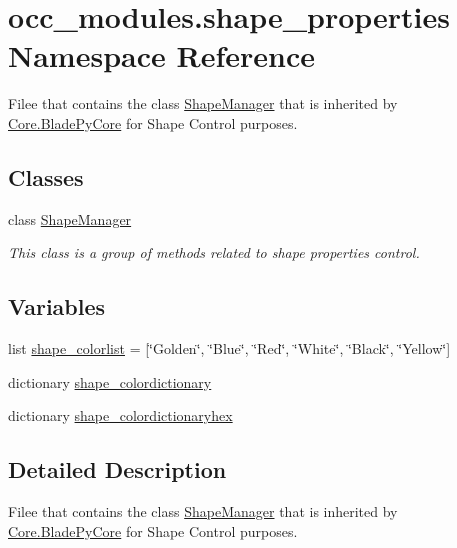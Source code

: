 \hypertarget{namespaceocc__modules_1_1shape__properties}{}\section{occ\+\_\+modules.\+shape\+\_\+properties Namespace Reference}
\label{namespaceocc__modules_1_1shape__properties}


Filee that contains the class \hyperlink{classocc__modules_1_1shape__properties_1_1_shape_manager}{Shape\+Manager} that is inherited by \hyperlink{class_core_1_1_blade_py_core}{Core.\+Blade\+Py\+Core} for Shape Control purposes.  


\subsection*{Classes}
\begin{DoxyCompactItemize}
\item 
class \hyperlink{classocc__modules_1_1shape__properties_1_1_shape_manager}{Shape\+Manager}
\begin{DoxyCompactList}\small\item\em This class is a group of methods related to shape properties control. \end{DoxyCompactList}\end{DoxyCompactItemize}
\subsection*{Variables}
\begin{DoxyCompactItemize}
\item 
list \hyperlink{namespaceocc__modules_1_1shape__properties_ad2dbba5d4e06c2ef16d74722e24325bb}{shape\+\_\+colorlist} = \mbox{[}\char`\"{}Golden\char`\"{}, \char`\"{}Blue\char`\"{}, \char`\"{}Red\char`\"{}, \char`\"{}White\char`\"{}, \char`\"{}Black\char`\"{}, \char`\"{}Yellow\char`\"{}\mbox{]}
\item 
dictionary \hyperlink{namespaceocc__modules_1_1shape__properties_a2435b9798b2353ff84c79fe909cc39fd}{shape\+\_\+colordictionary}
\item 
dictionary \hyperlink{namespaceocc__modules_1_1shape__properties_a8deb972f03c3f2b89ddc04b0006dd0b2}{shape\+\_\+colordictionaryhex}
\end{DoxyCompactItemize}


\subsection{Detailed Description}
Filee that contains the class \hyperlink{classocc__modules_1_1shape__properties_1_1_shape_manager}{Shape\+Manager} that is inherited by \hyperlink{class_core_1_1_blade_py_core}{Core.\+Blade\+Py\+Core} for Shape Control purposes. 

